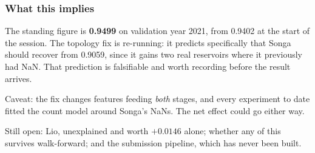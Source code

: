 \subsubsection*{What this implies}

The standing figure is \textbf{0.9499} on validation year 2021, from 0.9402 at the start of the
session. The topology fix is re-running: it predicts specifically that Songa should recover from
0.9059, since it gains two real reservoirs where it previously had NaN. That prediction is
falsifiable and worth recording before the result arrives.

Caveat: the fix changes features feeding \emph{both} stages, and every experiment to date fitted
the count model around Songa's NaNs. The net effect could go either way.

Still open: Lio, unexplained and worth $+0.0146$ alone; whether any of this survives walk-forward;
and the submission pipeline, which has never been built.
